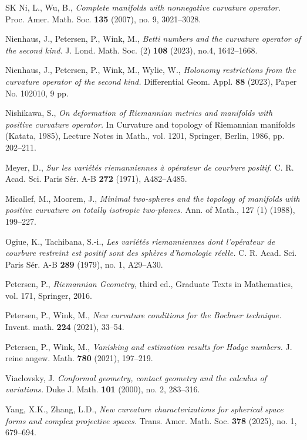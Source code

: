 \documentclass[12pt, twoside]{article}
\theoremstyle{definition}
\numberwithin{equation}{section}
\begin{document}
\begin{thebibliography}{SK}
Ni, L., Wu, B.,
\textit{Complete manifolds with nonnegative curvature operator.}
Proc. Amer. Math. Soc. \textbf{135} (2007), no. 9, 3021--3028. 


Nienhaus, J., Petersen, P., Wink, M.,
\textit{Betti numbers and the curvature operator of the second kind.}
J. Lond. Math. Soc. (2) \textbf{108} (2023), no.4, 1642--1668. 

Nienhaus, J., Petersen, P., Wink, M., Wylie, W.,
\textit{Holonomy restrictions from the curvature operator of the second kind.}
Differential Geom. Appl. \textbf{88} (2023), Paper No. 102010, 9 pp. 

Nishikawa, S.,
\textit{On deformation of Riemannian metrics and manifolds with positive curvature operator.} In Curvature and topology of Riemannian manifolds (Katata, 1985), Lecture Notes in Math., vol. 1201, Springer, Berlin, 1986, pp. 202--211. 

Meyer, D.,
\textit{Sur les vari\'{e}t\'{e}s riemanniennes \`{a} op\'{e}rateur de courbure positif.} 
C. R. Acad. Sci. Paris S\'{e}r. A-B \textbf{272} (1971), A482--A485. 

Micallef, M.,  Moorem, J.,
\textit{Minimal two-spheres and the topology of manifolds with positive curvature on totally isotropic two-planes.}
Ann. of Math., 127 (1) (1988), 199--227. 

Ogiue, K., Tachibana, S.-i.,
\textit{Les vari\'{e}t\'{e}s riemanniennes dont l'op\'{e}rateur de courbure restreint est positif sont des sph\`{e}res d'homologie r\'{e}elle.}
C. R. Acad. Sci. Paris Sér. A-B \textbf{289} (1979), no. 1, A29--A30.

Petersen, P.,
\textit{Riemannian Geometry,}
third ed., Graduate Texts in Mathematics, vol. 171, Springer, 2016.

Petersen, P., Wink, M.,
\textit{New curvature conditions for the Bochner technique.}
Invent. math. \textbf{224} (2021), 33--54.

Petersen, P., Wink, M.,
\textit{Vanishing and estimation results for Hodge numbers.}
 J. reine angew. Math. \textbf{780} (2021), 197--219.

Viaclovsky, J. 
\textit{Conformal geometry, contact geometry and the calculus of variations.}
Duke J. Math. \textbf{101} (2000), no. 2, 283--316.


 Yang, X.K., Zhang, L.D.,
 \textit{ New curvature characterizations for spherical space forms and complex projective spaces.} 
 Trans. Amer. Math. Soc. \textbf{378} (2025), no. 1, 679--694.


\end{thebibliography}
\end{document}
